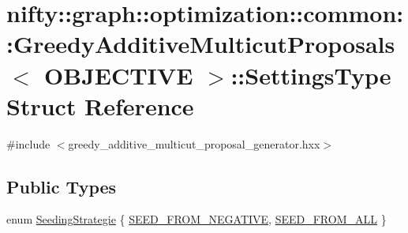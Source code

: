 \hypertarget{structnifty_1_1graph_1_1optimization_1_1common_1_1GreedyAdditiveMulticutProposals_1_1SettingsType}{}\section{nifty\+:\+:graph\+:\+:optimization\+:\+:common\+:\+:Greedy\+Additive\+Multicut\+Proposals$<$ O\+B\+J\+E\+C\+T\+I\+V\+E $>$\+:\+:Settings\+Type Struct Reference}
\label{structnifty_1_1graph_1_1optimization_1_1common_1_1GreedyAdditiveMulticutProposals_1_1SettingsType}


{\ttfamily \#include $<$greedy\+\_\+additive\+\_\+multicut\+\_\+proposal\+\_\+generator.\+hxx$>$}

\subsection*{Public Types}
\begin{DoxyCompactItemize}
\item 
enum \hyperlink{structnifty_1_1graph_1_1optimization_1_1common_1_1GreedyAdditiveMulticutProposals_1_1SettingsType_a786cca58f307f93acb43d427201599b4}{Seeding\+Strategie} \{ \hyperlink{structnifty_1_1graph_1_1optimization_1_1common_1_1GreedyAdditiveMulticutProposals_1_1SettingsType_a786cca58f307f93acb43d427201599b4a43fd0d8797771082333f84c4494a1019}{S\+E\+E\+D\+\_\+\+F\+R\+O\+M\+\_\+\+N\+E\+G\+A\+T\+I\+V\+E}, 
\hyperlink{structnifty_1_1graph_1_1optimization_1_1common_1_1GreedyAdditiveMulticutProposals_1_1SettingsType_a786cca58f307f93acb43d427201599b4abeecc18ee23661c80bec9dbb9517b8b9}{S\+E\+E\+D\+\_\+\+F\+R\+O\+M\+\_\+\+A\+L\+L}
 \}
\end{DoxyCompactItemize}
